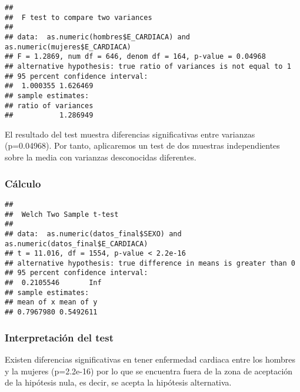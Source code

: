 \documentclass[
]{article}
\newenvironment{Shaded}{\begin{snugshade}}{\end{snugshade}}
\newcommand{\AttributeTok}[1]{\textcolor[rgb]{0.80,0.80,0.80}{#1}}
\newcommand{\FloatTok}[1]{\textcolor[rgb]{0.75,0.75,0.82}{#1}}
\newcommand{\FunctionTok}[1]{\textcolor[rgb]{0.94,0.94,0.56}{#1}}
\newcommand{\NormalTok}[1]{\textcolor[rgb]{0.80,0.80,0.80}{#1}}
\newcommand{\SpecialCharTok}[1]{\textcolor[rgb]{0.86,0.64,0.64}{#1}}
\newcommand{\StringTok}[1]{\textcolor[rgb]{0.80,0.58,0.58}{#1}}
\begin{document}
\begin{verbatim}
## 
##  F test to compare two variances
## 
## data:  as.numeric(hombres$E_CARDIACA) and as.numeric(mujeres$E_CARDIACA)
## F = 1.2869, num df = 646, denom df = 164, p-value = 0.04968
## alternative hypothesis: true ratio of variances is not equal to 1
## 95 percent confidence interval:
##  1.000355 1.626469
## sample estimates:
## ratio of variances 
##           1.286949
\end{verbatim}

El resultado del test muestra diferencias significativas entre varianzas
(p=0.04968). Por tanto, aplicaremos un test de dos muestras
independientes sobre la media con varianzas desconocidas diferentes.

\hypertarget{cuxe1lculo}{%
\subsubsection{Cálculo}\label{cuxe1lculo}}

\begin{Shaded}
\end{Shaded}

\begin{verbatim}
## 
##  Welch Two Sample t-test
## 
## data:  as.numeric(datos_final$SEXO) and as.numeric(datos_final$E_CARDIACA)
## t = 11.016, df = 1554, p-value < 2.2e-16
## alternative hypothesis: true difference in means is greater than 0
## 95 percent confidence interval:
##  0.2105546       Inf
## sample estimates:
## mean of x mean of y 
## 0.7967980 0.5492611
\end{verbatim}

\hypertarget{interpretaciuxf3n-del-test}{%
\subsubsection{Interpretación del
test}\label{interpretaciuxf3n-del-test}}

Existen diferencias significativas en tener enfermedad cardiaca entre
los hombres y la mujeres (p=2.2e-16) por lo que se encuentra fuera de la
zona de aceptación de la hipótesis nula, es decir, se acepta la
hipótesis alternativa.
\end{document}
